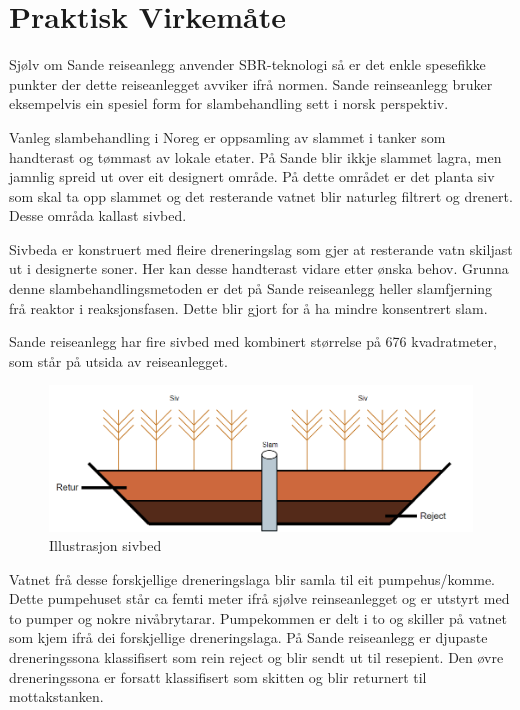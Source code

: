 \newpage
\section{Praktisk Virkemåte}
\thispagestyle{fancy}

Sjølv om Sande reiseanlegg anvender SBR-teknologi så er det enkle spesefikke
punkter der dette reiseanlegget avviker ifrå normen. 
Sande reinseanlegg bruker eksempelvis ein spesiel form for slambehandling sett i norsk perspektiv.

Vanleg slambehandling i Noreg er oppsamling av slammet i tanker som handterast og tømmast av lokale etater.
På Sande blir ikkje slammet lagra, men jamnlig spreid ut over eit designert område. På dette området er
det planta siv som skal ta opp slammet og det resterande vatnet blir naturleg filtrert og drenert.
Desse områda kallast sivbed.

Sivbeda er konstruert med fleire dreneringslag som gjer at resterande vatn skiljast ut i designerte soner.
Her kan desse handterast vidare etter ønska behov. 
Grunna denne slambehandlingsmetoden er det på Sande reiseanlegg heller slamfjerning frå reaktor
i reaksjonsfasen. Dette blir gjort for å ha mindre konsentrert slam.

Sande reiseanlegg har fire sivbed med kombinert størrelse på 676 kvadratmeter, som står på utsida av reiseanlegget.


\begin{figure}[htbp]
    \centering
    \includegraphics[width=1\textwidth]{Figurar/Sivbed.png}
    \caption{Illustrasjon sivbed}\label{fig:HMI}
\end{figure}


\newpage

Vatnet frå desse forskjellige dreneringslaga blir samla til eit pumpehus/komme.
Dette pumpehuset står ca femti meter ifrå sjølve reinseanlegget og er utstyrt med to pumper og nokre nivåbrytarar.
Pumpekommen er delt i to og skiller på vatnet som kjem ifrå dei forskjellige dreneringslaga. \newline
På Sande reiseanlegg er djupaste dreneringssona klassifisert som rein reject og blir sendt ut til resepient.
Den øvre dreneringssona er forsatt klassifisert som skitten og blir returnert til mottakstanken.

